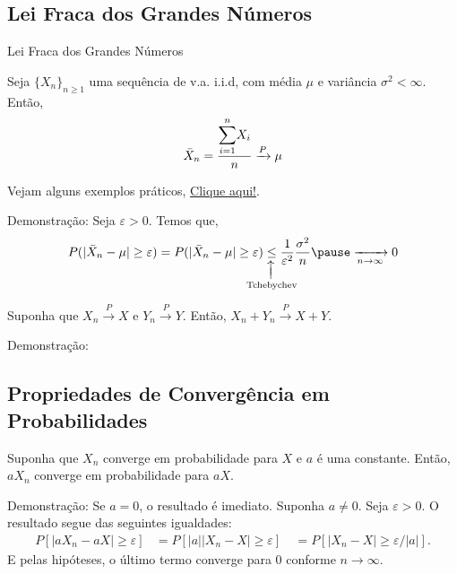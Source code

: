 \documentclass[12pt]{beamer}
\begin{document}
\subsection{Lei Fraca dos Grandes Números}
\begin{frame}{Lei Fraca dos Grandes Números}
\begin{Teorema}
\justifying
Seja $\{X_{n}\}_{n\geq 1}$ uma sequência de v.a. i.i.d, com média $\mu$ e variância $\sigma^{2}<\infty.$ Então, $$\Bar{X}_{n}=\dfrac{{\displaystyle \sum_{i=1}^{n}} X_{i}}{n}\xrightarrow{P} \mu$$

Vejam alguns exemplos práticos, \href{https://est711.shinyapps.io/ConvergenciaProbabilidade/}{Clique aqui!}.
\end{Teorema}
\pause
\begin{block}{Demonstração:}
\justifying
Seja $\varepsilon>0.$ Temos que, $$P(|\Bar{X}_{n}-\mu|\geq \varepsilon)=P(|\Bar{X}_{n}-\mu|\geq \varepsilon) \underset{\mathclap{\substack{\xuparrow[10pt] \\ \text{Tchebychev}}}}{\leq}\dfrac{1}{\varepsilon^{2}} \dfrac{\sigma^{2}}{n} \pause\xrightarrow[n\rightarrow\infty]{} 0
$$
\end{block}
\end{frame}

\begin{frame}{}
\begin{Teorema}
\justifying
Suponha que $X_{n}\xrightarrow{P} X$ e $Y_{n}\xrightarrow{P} Y.$ Então, $X_{n}+Y_{n}\xrightarrow{P} X+Y.$
\end{Teorema}
\begin{block}{Demonstração:}
\justifying
{}
\end{block}
\end{frame}

\subsection{Propriedades de Convergência em Probabilidades}
\begin{frame}{}
\begin{Teorema}
\justifying
Suponha que $X_{n}$ converge em probabilidade para $X$ e $a$ é uma constante. Então, $aX_{n}$ converge em probabilidade para $aX$.
\end{Teorema}
\begin{block}{Demonstração:}
\justifying
Se $a = 0$, o resultado é imediato. Suponha $a \neq 0$. Seja $\varepsilon > 0$. O resultado segue das seguintes igualdades:
\begin{align*}
P[|aX_{n} - aX| \geq \varepsilon] &= P[|a||X_{n} - X| \geq \varepsilon] \
&= P[|X_{n} - X| \geq \varepsilon/|a|].
\end{align*}
E pelas hipóteses, o último termo converge para $0$ conforme $n \to \infty$.
\end{block}
\end{frame}
\end{document}
